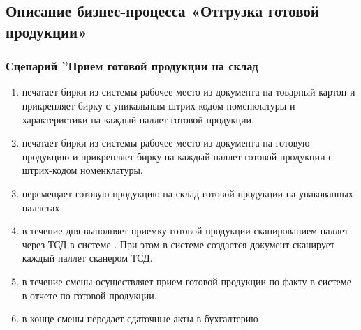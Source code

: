\subsection{Описание бизнес-процесса «Отгрузка готовой продукции»}
\label{bp:goods}

\subsubsection{Сценарий ''Прием готовой продукции на склад}
\label{bp:goods_1}



\begin{enumerate}

\item  \gaoperator печатает бирки из системы \gofro рабочее место  из документа   на товарный картон и прикрепляет бирку с уникальным штрих-кодом 
номенклатуры и характеристики
на каждый паллет готовой продукции.
\item  \operator печатает бирки из системы \gofro рабочее место  из документа   на готовую продукцию и прикрепляет бирку %
на каждый паллет готовой продукции с штрих-кодом номенклатуры.

\item \driver перемещает готовую продукцию на склад готовой продукции на упакованных паллетах.
\item \driver в течение дня выполняет приемку готовой продукции сканированием паллет через ТСД в системе \erp. При этом в системе \erp создается документ 
\driver сканирует каждый паллет сканером ТСД.

\item  \kladovshik в течение смены осуществляет прием готовой продукции по факту в системе \erp в отчете по готовой продукции. 
\item  \kladovshik  в конце смены  передает сдаточные акты в бухгалтерию


\end{enumerate}
